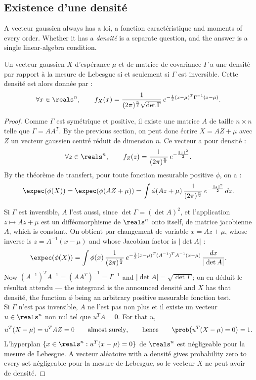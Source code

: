 \subsection{Existence d'une densité}

A vecteur gaussien always has a loi, a fonction caractéristique and
moments of every order. Whether it has a \emph{densité} is a separate question,
and the answer is a single linear-algebra condition.

\begin{theorem}
Un vecteur gaussien $X$ d'espérance $\mu$ et de matrice de covariance $\Gamma$ a
une densité par rapport à la mesure de Lebesgue si et seulement si $\Gamma$ est
inversible. Cette densité est alors donnée par :
\[
  \forall x \in \reals^{n}, \qquad
  f_{X}(x) = \frac{1}{(2\pi)^{\frac{n}{2}}\sqrt{\det\Gamma}}\,
             e^{-\frac{1}{2}(x-\mu)^{T}\Gamma^{-1}(x-\mu)} .
\]
\end{theorem}

\begin{proof}
Comme $\Gamma$ est symétrique et positive, il existe une matrice $A$ de taille
$n \times n$ telle que $\Gamma = AA^{T}$. By the previous section, on peut donc
écrire $X = AZ + \mu$ avec $Z$ un vecteur gaussien centré réduit de dimension
$n$. Ce vecteur a pour densité :
\[
  \forall z \in \reals^{n}, \qquad
  f_{Z}(z) = \frac{1}{(2\pi)^{\frac{n}{2}}}\, e^{-\frac{\|z\|^{2}}{2}} .
\]
By the théorème de transfert, pour toute fonction mesurable positive $\phi$, on
a :
\[
  \expec(\phi(X)) = \expec(\phi(AZ + \mu))
    = \int \phi(Az + \mu)\, \frac{1}{(2\pi)^{\frac{n}{2}}}\,
      e^{-\frac{\|z\|^{2}}{2}}\, dz .
\]

Si $\Gamma$ est inversible, $A$ l'est aussi, since $\det\Gamma = (\det A)^{2}$,
et l'application $z \mapsto Az + \mu$ est un difféomorphisme de $\reals^{n}$ onto
itself, de matrice jacobienne $A$, which is constant. On obtient par changement
de variable $x = Az + \mu$, whose inverse is $z = A^{-1}(x-\mu)$ and whose
Jacobian factor is $|\det A|$ :
\[
  \expec(\phi(X)) = \int \phi(x)\, \frac{1}{(2\pi)^{\frac{n}{2}}}\,
    e^{-\frac{1}{2}(x-\mu)^{T}(A^{-1})^{T}A^{-1}(x-\mu)}\,
    \frac{dx}{|\det A|} .
\]
Now $(A^{-1})^{T}A^{-1} = (AA^{T})^{-1} = \Gamma^{-1}$ and
$|\det A| = \sqrt{\det\Gamma}$; on en déduit le résultat attendu --- the
integrand is the announced densité and $X$ has that densité, the function $\phi$
being an arbitrary positive mesurable fonction test.\\

Si $\Gamma$ n'est pas inversible, $A$ ne l'est pas non plus et il existe un
vecteur $u \in \reals^{n}$ non nul tel que $u^{T}A = 0$. For that
$u$,
\[
  u^{T}(X - \mu) = u^{T}AZ = 0 \qquad \text{almost surely}, \qquad \text{hence}
  \qquad \prob\!\left(u^{T}(X-\mu) = 0\right) = 1 .
\]
L'hyperplan $\{x \in \reals^{n} : u^{T}(x - \mu) = 0\}$ de $\reals^{n}$ est
négligeable pour la mesure de Lebesgue. A vecteur aléatoire with a densité gives
probability zero to every set négligeable pour la mesure de Lebesgue, so le
vecteur $X$ ne peut avoir de densité.
\end{proof}

